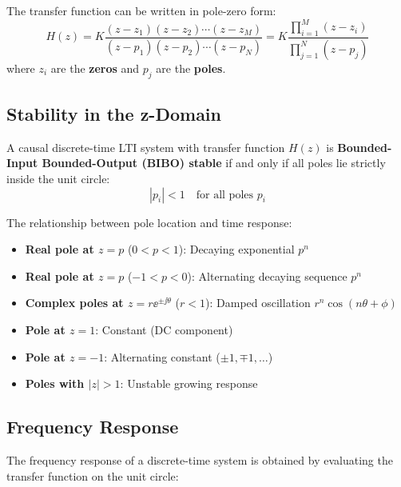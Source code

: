 The transfer function can be written in pole-zero form:
\begin{equation}
H(z) = K \frac{(z-z_1)(z-z_2)\cdots(z-z_M)}{(z-p_1)(z-p_2)\cdots(z-p_N)} = K \frac{\prod_{i=1}^{M}(z-z_i)}{\prod_{j=1}^{N}(z-p_j)}
\end{equation}
where $z_i$ are the \textbf{zeros} and $p_j$ are the \textbf{poles}.

\subsection{Stability in the z-Domain}

\begin{keyconceptbox}[title=BIBO Stability in the $z$-Domain]
A causal discrete-time LTI system with transfer function $H(z)$ is \textbf{Bounded-Input Bounded-Output (BIBO) stable} if and only if all poles lie strictly inside the unit circle:
\begin{equation}
|p_i| < 1 \quad \text{for all poles } p_i
\end{equation}
\end{keyconceptbox}

The relationship between pole location and time response:
\begin{itemize}
    \item \textbf{Real pole at $z = p$} ($0 < p < 1$): Decaying exponential $p^n$
    \item \textbf{Real pole at $z = p$} ($-1 < p < 0$): Alternating decaying sequence $p^n$
    \item \textbf{Complex poles at $z = r\ee^{\pm\jj\theta}$} ($r < 1$): Damped oscillation $r^n\cos(n\theta + \phi)$
    \item \textbf{Pole at $z = 1$}: Constant (DC component)
    \item \textbf{Pole at $z = -1$}: Alternating constant ($\pm 1, \mp 1, \ldots$)
    \item \textbf{Poles with $|z| > 1$}: Unstable growing response
\end{itemize}



\subsection{Frequency Response}

The frequency response of a discrete-time system is obtained by evaluating the transfer function on the unit circle:


